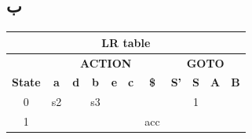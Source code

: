 \documentclass{article}
\begin{document}
\subsection{ب}
\begin{latin}
\begin{table}[H]
\begin{tabular}{|ccccccccccc|}
\hline
\multicolumn{11}{|c|}{\textbf{LR table}}                                                                                                                                                                                                                                                                                                                                                                                                         \\ \hline
\multicolumn{1}{|c|}{}                                 & \multicolumn{6}{c|}{\textbf{ACTION}}                                                                                                                                                                                      & \multicolumn{4}{c|}{\textbf{GOTO}}                                                                                                                          \\ \cline{2-11} 
\multicolumn{1}{|c|}{\multirow{-2}{*}{\textbf{State}}} & \multicolumn{1}{c|}{\textbf{a}} & \multicolumn{1}{c|}{\textbf{d}} & \multicolumn{1}{c|}{\textbf{b}} & \multicolumn{1}{c|}{\textbf{e}} & \multicolumn{1}{c|}{\textbf{c}} & \multicolumn{1}{c|}{\textbf{\$}}                & \multicolumn{1}{c|}{\textbf{S'}} & \multicolumn{1}{c|}{\textbf{S}}               & \multicolumn{1}{c|}{\textbf{A}}               & \textbf{B}               \\ \hline
\multicolumn{1}{|c|}{{\color[HTML]{0000FF} 0}}         & \multicolumn{1}{c|}{s2}         & \multicolumn{1}{c|}{}           & \multicolumn{1}{c|}{s3}         & \multicolumn{1}{c|}{}           & \multicolumn{1}{c|}{}           & \multicolumn{1}{c|}{}                           & \multicolumn{1}{c|}{}            & \multicolumn{1}{c|}{{\color[HTML]{0000FF} 1}} & \multicolumn{1}{c|}{}                         &                          \\ \hline
\multicolumn{1}{|c|}{{\color[HTML]{0000FF} 1}}         & \multicolumn{1}{c|}{}           & \multicolumn{1}{c|}{}           & \multicolumn{1}{c|}{}           & \multicolumn{1}{c|}{}           & \multicolumn{1}{c|}{}           & \multicolumn{1}{c|}{{\color[HTML]{008000} acc}} & \multicolumn{1}{c|}{}            & \multicolumn{1}{c|}{}                         & \multicolumn{1}{c|}{}                         &                          \\ \hline

\end{tabular}
\end{table}
\end{latin}
\end{document}
